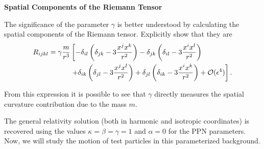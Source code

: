 \begin{exercise}
\textbf{Spatial Components of the Riemann Tensor}

The significance of the parameter $\gamma$ is better understood by calculating the spatial components of the Riemann tensor. Explicitly show that they are
\begin{align}
R_{ijkl} = \gamma \frac{m}{r^3} & \left[ -\delta_{il}\left( \delta_{jk} - 3 \frac{x^j x^k}{r^2} \right) - \delta_{jk} \left( \delta_{il} - 3 \frac{x^i x^l}{r^2} \right) \right. \notag \\
& \left. +\delta_{ik}\left( \delta_{jl} - 3 \frac{x^j x^l}{r^2} \right) +\delta_{jl}\left( \delta_{ik} - 3 \frac{x^i x^k}{r^2} \right) + \mathcal{O} (\epsilon ^4)\right].
\end{align}

From this expression it is possible to see that $\gamma$ directly measures the spatial curvature contribution due to the mass $m$. 
\end{exercise}


The general relativity solution (both in harmonic and isotropic coordinates) is recovered using the values $\kappa = \beta = \gamma = 1$ and $\alpha=0$ for the PPN parameters. Now, we will study the motion of test particles in this parameterized background.



